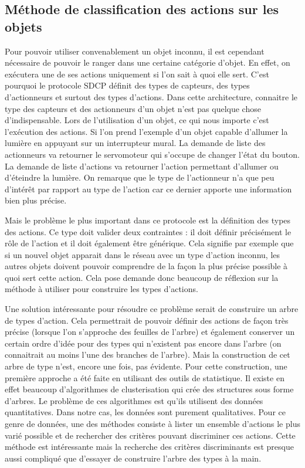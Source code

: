 	\subsection{Méthode de classification des actions sur les objets}
		Pour pouvoir utiliser convenablement un objet inconnu, il est cependant nécessaire de pouvoir
		le ranger dans une certaine catégorie d'objet. En effet, on exécutera une de ses actions 
		uniquement si l'on sait à quoi elle sert. C'est pourquoi le protocole SDCP définit des types
		de capteurs, des types d'actionneurs et surtout des types d'actions. Dans cette architecture,
		connaitre le type des capteurs et des actionneurs d'un objet n'est pas quelque chose 
		d'indispensable. Lors de l'utilisation d'un objet, ce qui nous importe c'est l'exécution 
		des actions. Si l'on prend l'exemple d'un objet capable d'allumer la lumière en appuyant 
		sur un interrupteur mural. La demande de liste des actionneurs va retourner le servomoteur
		qui s'occupe de changer l'état du bouton. La demande de liste d'actions va retourner l'action
		permettant d'allumer ou d'éteindre la lumière. On remarque que le type de l'actionneur n'a
		que peu d'intérêt par rapport au type de l'action car ce dernier apporte une information bien
		plus précise.
		
		Mais le problème le plus important dans ce protocole est la définition des types des actions.
		Ce type doit valider deux contraintes : il doit définir précisément le rôle de l'action et
		il doit également être générique. Cela signifie par exemple que si un nouvel objet
		apparait dans le réseau avec un type d'action inconnu, les autres objets doivent pouvoir 
		comprendre de la façon la plus précise possible à quoi sert cette action. Cela pose demande
		donc beaucoup de réflexion sur la méthode à utiliser pour construire les types d'actions.
		
		Une solution intéressante pour résoudre ce problème serait de construire un arbre de types
		d'action. Cela permettrait de pouvoir définir des actions de façon très précise (lorsque l'on
		s'approche des feuilles de l'arbre) et également conserver un certain ordre d'idée pour 
		des types qui n'existent pas encore dans l'arbre (on connaitrait au moins l'une des branches de
		l'arbre). Mais la construction de cet arbre de type n'est, encore une fois, pas évidente.
		Pour cette construction, une première approche a été faite en utilisant des outils de
		statistique. Il existe en effet beaucoup d'algorithmes de clusterisation qui crée des
		structures sous forme d'arbres. Le problème de ces algorithmes est qu'ils utilisent des 
		données
		quantitatives. Dans notre cas, les données sont purement qualitatives. Pour ce genre de
		données, une des méthodes consiste à lister un ensemble d'actions le plus varié possible et
		de rechercher des critères pouvant discriminer ces actions. Cette méthode est intéressante 
mais
 		la recherche des critères discriminants est presque aussi compliqué que d'essayer de 
construire
		l'arbre des types à la main.
		
